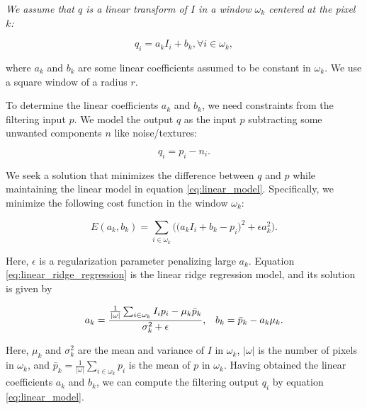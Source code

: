 \vspace{1em}
{\itshape
\noindent We assume that $q$ is a linear transform of $I$ in a window $\omega_{k}$ centered at the pixel $k$:

\begin{equation} \label{eq:linear_model}
    q_{i}=a_{k}I_{i}+b_{k}, \forall i \in \omega_{k},
\end{equation}

\noindent where $a_k$ and $b_k$ are some linear coefficients assumed to be constant in $\omega_{k}$. We use a square window of a radius $r$.

\noindent To determine the linear coefficients $a_k$ and $b_k$, we need constraints from the filtering input $p$. We model the output $q$ as the input $p$ subtracting some unwanted components $n$ like noise/textures:

\begin{equation}
    q_{i}=p_{i}-n_{i}.
\end{equation}

\noindent We seek a solution that minimizes the difference between $q$ and $p$ while maintaining the linear model in equation \ref{eq:linear_model}. Specifically, we minimize the following cost function in the window $\omega_{k}$:

\begin{equation} \label{eq:linear_ridge_regression}
    E(a_{k}, b_{k})=\sum_{i \in \omega_{k}}\big(\big(a_{k}I_{i}+b_{k}-p_{i}\big)^{2}+\epsilon a_{k}^{2}\big).
\end{equation}

\noindent Here, $\epsilon$ is a regularization parameter penalizing large $a_k$. Equation \ref{eq:linear_ridge_regression} is the linear ridge regression model, and its solution is given by

\begin{align} \label{eq:gif_coefficient}
    a_{k}={{1\over \vert \omega \vert } \sum_{i\in \omega_{k}}I_{i}p_{i}-\mu_{k}\bar{p}_{k}\over \sigma_{k}^{2}+\epsilon }, && b_{k}=\bar{p}_{k}-a_{k}\mu_{k}.
\end{align}

\noindent Here, $\mu_{k}$ and $\sigma_{k}^{2}$ are the mean and variance of $I$ in $\omega_{k}$, $\vert \omega \vert$ is the number of pixels in $\omega_{k}$, and $\bar{p}_{k} = \frac{1}{ \vert \omega \vert } \sum_{i\in \omega_{k}}p_{i}$ is the mean of $p$ in $\omega_{k}$. Having obtained the linear coefficients $a_k$ and $b_k$, we can compute the filtering output $q_i$ by equation \ref{eq:linear_model}.

}
